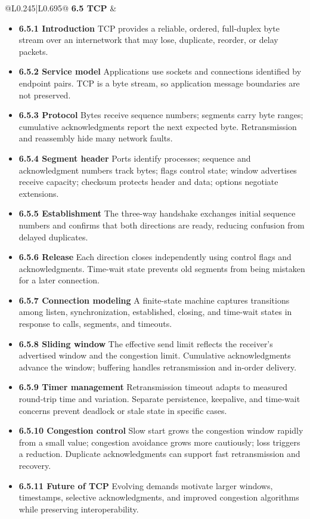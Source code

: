 \documentclass[10pt,letterpaper]{article}
\begin{document}
\begin{longtable}{@{}L{0.245\textwidth}|L{0.695\textwidth}@{}}
\textbf{6.5 TCP} & \begin{minipage}[t]{\linewidth}\raggedright \begin{itemize}\item \textbf{6.5.1 Introduction} TCP provides a reliable, ordered, full-duplex byte stream over an internetwork that may lose, duplicate, reorder, or delay packets.\item \textbf{6.5.2 Service model} Applications use sockets and connections identified by endpoint pairs. TCP is a byte stream, so application message boundaries are not preserved.\item \textbf{6.5.3 Protocol} Bytes receive sequence numbers; segments carry byte ranges; cumulative acknowledgments report the next expected byte. Retransmission and reassembly hide many network faults.\item \textbf{6.5.4 Segment header} Ports identify processes; sequence and acknowledgment numbers track bytes; flags control state; window advertises receive capacity; checksum protects header and data; options negotiate extensions.\item \textbf{6.5.5 Establishment} The three-way handshake exchanges initial sequence numbers and confirms that both directions are ready, reducing confusion from delayed duplicates.\item \textbf{6.5.6 Release} Each direction closes independently using control flags and acknowledgments. Time-wait state prevents old segments from being mistaken for a later connection.\item \textbf{6.5.7 Connection modeling} A finite-state machine captures transitions among listen, synchronization, established, closing, and time-wait states in response to calls, segments, and timeouts.\item \textbf{6.5.8 Sliding window} The effective send limit reflects the receiver's advertised window and the congestion limit. Cumulative acknowledgments advance the window; buffering handles retransmission and in-order delivery.\item \textbf{6.5.9 Timer management} Retransmission timeout adapts to measured round-trip time and variation. Separate persistence, keepalive, and time-wait concerns prevent deadlock or stale state in specific cases.\item \textbf{6.5.10 Congestion control} Slow start grows the congestion window rapidly from a small value; congestion avoidance grows more cautiously; loss triggers a reduction. Duplicate acknowledgments can support fast retransmission and recovery.\item \textbf{6.5.11 Future of TCP} Evolving demands motivate larger windows, timestamps, selective acknowledgments, and improved congestion algorithms while preserving interoperability.\end{itemize}\end{minipage} \\ \hline

\end{longtable}
\end{document}
